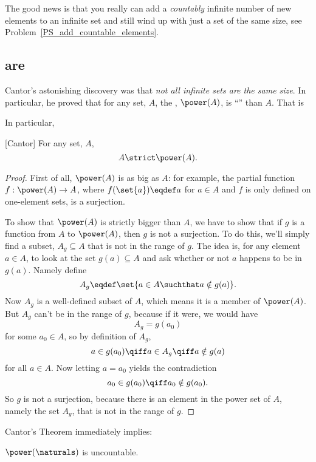 The good news is that you really can add a \emph{countably} infinite
number of new elements to an infinite set and still wind up with just
a set of the same size, see Problem~\ref{PS_add_countable_elements}.

\subsection{ are }

Cantor's astonishing discovery was that \emph{not all infinite sets
  are the same size}.  In particular, he proved that for any set, $A$,
the , $\power(A)$, is ``'' than
$A$.  That is

In particular,
\begin{theorem}\label{powbig}[Cantor]\mbox{}
For any set, $A$,
\[
A \strict \power(A).
\]
\end{theorem}
\begin{proof}
  First of all, $\power(A)$ is as big as $A$: for example, the partial
  function $f:\power(A) \to A$, where $f(\set{a}) \eqdef a$ for $a \in
  A$ and $f$ is only defined on one-element sets, is a surjection.

  To show that $\power(A)$ is strictly bigger than $A$, we have to
  show that if $g$ is a function from $A$ to $\power(A)$, then $g$ is
  not a surjection.  To do this, we'll simply find a subset, $A_g
  \subseteq A$ that is not in the range of $g$.  The idea is, for any
  element $a \in A$, to look at the set $g(a) \subseteq A$ and ask
  whether or not $a$ happens to be in $g(a)$.  Namely define \iffalse
  mimicking Russell's Paradox,\fi
  \[
  A_g \eqdef \set{a \in A \suchthat a \notin g(a)}.
  \]
  Now $A_g$ is a well-defined subset of $A$, which means it is a
  member of $\power(A)$.  But $A_g$ can't be in the range of $g$,
  because if it were, we would have
\[
A_g = g(a_0)
\]
for some $a_0 \in A$, so by definition of $A_g$,
\[
a \in g(a_0) \qiff a \in A_g \qiff a \notin g(a)
\]
for all $a \in A$.  Now letting $a = a_0$ yields the contradiction
\[
a_0 \in g(a_0) \qiff a_0 \notin g(a_0).
\]
So $g$ is not a surjection, because there is an element in the power
set of $A$, namely the set $A_g$, that is not in the range of $g$.
\end{proof}

Cantor's Theorem immediately implies:

\begin{corollary}
$\power(\naturals)$ is uncountable.
\end{corollary}

